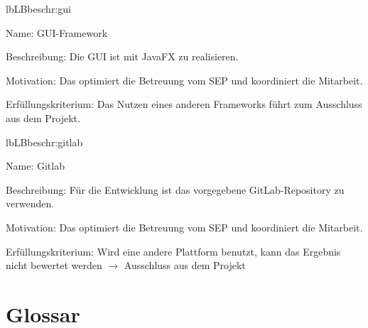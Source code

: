 \begin{description}[leftmargin=5em, style=sameline]
	\begin{lhp}{lb}{LB}{beschr:gui}
		\item [Name:] GUI-Framework
		\item [Beschreibung:] Die GUI ist mit JavaFX zu realisieren.
		\item [Motivation:] Das optimiert die Betreuung vom SEP und koordiniert die Mitarbeit.
		\item [Erfüllungskriterium:] Das Nutzen eines anderen Frameworks führt zum Ausschluss aus dem Projekt.
	\end{lhp}
	
	\begin{lhp}{lb}{LB}{beschr:gitlab}
		\item [Name:] Gitlab
		\item [Beschreibung:] Für die Entwicklung ist das vorgegebene GitLab-Repository zu verwenden.
		\item [Motivation:] Das optimiert die Betreuung vom SEP und koordiniert die Mitarbeit.
		\item [Erfüllungskriterium:] Wird eine andere Plattform benutzt, kann das Ergebnis nicht bewertet werden $\rightarrow$ Ausschluss aus dem Projekt
	\end{lhp}
	
	
\end{description}

\section{Glossar}

